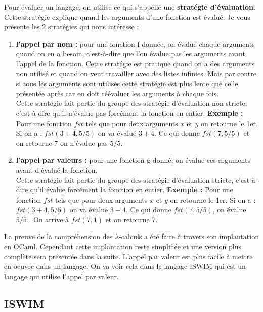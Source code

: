 \documentclass[10pt,a4paper]{report}
\begin{document}
Pour évaluer un langage, on utilise ce qui s'appelle une \textbf{stratégie d'évaluation}. Cette stratégie explique quand les arguments d'une fonction est évalué. Je vous présente les 2 stratégies qui nous intéresse :
\begin{enumerate}
\item \textbf{l'appel par nom :} pour une fonction f donnée, on évalue chaque arguments quand on en a besoin, c'est-à-dire que l'on évalue pas les arguments avant l'appel de la fonction. Cette stratégie est pratique quand on a des arguments non utilisé  et quand on veut travailler avec des listes infinies. Mais par contre si tous les arguments sont utilisés cette stratégie est plus lente que celle présentée après car on doit réévaluer les arguments à chaque fois. 
  \\Cette stratégie fait partie du groupe des stratégie d'évaluation non stricte, c'est-à-dire qu'il n'évalue pas forcément la fonction en entier. 
  \smallbreak
  \textbf{Exemple :} Pour une fonction $fst$ tels que pour deux arguments $x$ et $y$ on retourne le 1er. Si on a : $fst(3+4,5/5)$ on va évalué $3+4$. Ce qui donne $fst(7,5/5)$ et on retourne 7 on n'évalue pas $5/5$.
\item  \textbf{l'appel par valeurs :} pour une fonction g donné, on évalue ces arguments avant d'évalué la fonction.
  \\Cette stratégie fait partie du groupe des stratégie d'évaluation stricte, c'est-à-dire qu'il évalue forcément la fonction en entier.
  \smallbreak
  \textbf{Exemple :} Pour une fonction $fst$ tels que pour deux arguments $x$ et $y$ on retourne le 1er. Si on a : $fst(3+4,5/5)$ on va évalué $3+4$. Ce qui donne $fst(7,5/5)$, on évalue $5/5$ . On arrive à $fst(7,1)$ et on retourne 7.
\end{enumerate}
\medbreak

La preuve de la compréhension des $\lambda$-calculs a été faite à travers son implantation en OCaml. Cependant cette implantation reste simplifiée et une version plus complète sera présentée dans la suite. 
\smallbreak
L'appel par valeur est plus facile à mettre en oeuvre dans un langage.
On va voir cela dans le langage ISWIM qui est un langage qui utilise l'appel par valeur.
\newpage



\subsection{ISWIM}	
\end{document}
